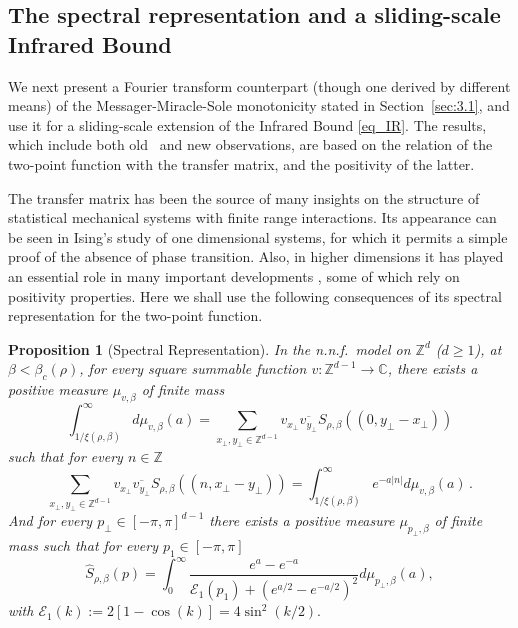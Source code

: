 \documentclass[a4paper,oneside,11pt]{article}
\def\Z{\mathbb{Z}}                          %
\newtheorem{proposition}[theorem]{Proposition}
\newcommand{\be}[1]{\begin{equation}\label{#1}}
\newcommand{\ee}{\end{equation}}
\numberwithin{equation}{section}
\numberwithin{equation}{section}
\numberwithin{equation}{section}
\def\Z{\mathbb{Z}}                          %
\def\be{\begin{equation}}
\def\ee{\end{equation}}
\begin{document}
\subsection{The spectral representation and a sliding-scale Infrared Bound}\label{sec:3.2}

We  next present a Fourier transform counterpart (though one derived by different means) of the Messager-Miracle-Sole monotonicity stated in Section~\ref{sec:3.1}, and use it for a sliding-scale extension of the  Infrared Bound \eqref{eq_IR}.  The results, which include both old~\cite{GliJaf73, Sok82} and new observations, are based on the relation of the two-point function with the transfer matrix, and the positivity of the latter.   



The transfer matrix has been the source of many insights on the structure of statistical mechanical systems with finite range interactions.  Its appearance can be seen in  Ising's study of one dimensional systems, for which it permits a simple proof of the absence of phase transition.   Also, in higher dimensions it has played an essential role in many important developments \cite{FroSimSpe76,GliJaf73,SchMatLie64}, some of which rely on positivity properties.   Here we  shall use the following consequences of its spectral representation for the two-point function.


\begin{proposition}[Spectral Representation]\label{prop:spec_rep}  In the n.n.f.~model on $\Z^d$ ($d\ge1$),  at $\beta<\beta_c(\rho)$, for every square summable function $v:\Z^{d-1}\rightarrow\mathbb C$, there exists a positive measure $\mu_{v,\beta}$ of  finite mass
  \be
 \int_{1/\xi(\rho,\beta)}^\infty  d\mu_{v,\beta} ( a) =  
  \sum_{x_\perp,y_\perp\in \Z^{d-1}}v_{x_\perp}\overline{v_{y_\perp}}S_{\rho,\beta}((0,y_\perp-x_\perp))
 \ee  
such that for every $n\in \Z$ 
 \begin{equation} \label{eq:spec_rep}
\sum_{x_\perp,y_\perp\in \Z^{d-1}}v_{x_\perp}\overline{v_{y_\perp}}S_{\rho,\beta}((n,x_\perp-y_\perp))=   
 \int_{1/\xi(\rho,\beta)}^\infty e^{-a|n|} d\mu_{v,\beta} ( a) \, .
 \end{equation}
And for every $p_\perp \in[-\pi,\pi]^{d-1}$  there exists a positive measure  $\mu_{p_\perp,\beta}$ of  finite mass such that for every $p_1 \in[-\pi,\pi]$
          \be \label{eq:repr}
        \widehat S_{\rho,\beta}(p) =\int_0^\infty \frac{ e^a - e^{-a}}
         {\mathcal E_1(p_1)  + ( e^{a/2} - e^{-a/2})^2}d\mu_{p_\perp,\beta}(a),      \ee
with $\mathcal E_1(k) := 2[1- \cos(k)]= 4   \sin^2(k/2).$
\end{proposition}
   
\end{document}
